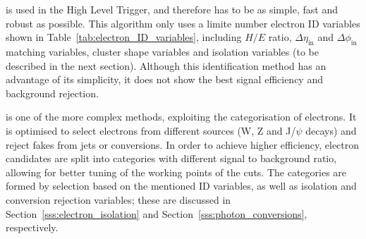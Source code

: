 \begin{description}[wide=\parindent]
  \item[Simple cut-based ID] \autocite{SCB_ID} is used in the High Level Trigger, and therefore has to be as simple,
fast and robust as possible. This algorithm only uses a limite number electron ID variables shown in
Table~\ref{tab:electron_ID_variables}, including $H/E$ ratio, $\Delta\eta_{\text{in}}$ and $\Delta\phi_{\text{in}}$
matching variables, cluster shape variables and isolation variables (to be described in the next section). Although this
identification method has an advantage of its simplicity, it does not show the best signal efficiency and background
rejection.

 \item[Cuts in categories ID] \autocite{CiC_ID} is one of the more complex methods, exploiting the categorisation of
electrons. It is optimised to select electrons from different sources (W, Z and J/$\psi$ decays) and reject fakes from
jets or conversions. In order to achieve higher efficiency, electron candidates are split into categories with different
signal to background ratio, allowing for better tuning of the working points of the cuts. The categories are formed by
selection based on the mentioned ID variables, as well as isolation and conversion rejection variables; these are
discussed in Section~\ref{sss:electron_isolation} and Section~\ref{sss:photon_conversions}, respectively.





\end{description}
